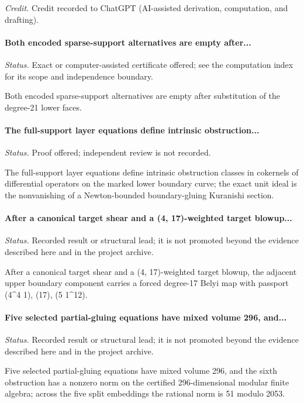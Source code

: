 \emph{Credit.} Credit recorded to ChatGPT (AI-assisted derivation, computation, and drafting).

\label{supp-note-06-019}
\paragraph{Both encoded sparse-support alternatives are empty after...}
\emph{Status.} Exact or computer-assisted certificate offered; see the computation index for its scope and independence boundary.

Both encoded sparse-support alternatives are empty after substitution of the degree-21 lower faces.

\label{supp-note-06-020}
\paragraph{The full-support layer equations define intrinsic obstruction...}
\emph{Status.} Proof offered; independent review is not recorded.

The full-support layer equations define intrinsic obstruction classes in cokernels of differential operators on the marked lower boundary curve; the exact unit ideal is the nonvanishing of a Newton-bounded boundary-gluing Kuranishi section.

\label{supp-note-06-021}
\paragraph{After a canonical target shear and a (4, 17)-weighted target blowup...}
\emph{Status.} Recorded result or structural lead; it is not promoted beyond the evidence described here and in the project archive.

After a canonical target shear and a (4, 17)-weighted target blowup, the adjacent upper boundary component carries a forced degree-17 Belyi map with passport (4\textasciicircum{}4 1), (17), (5 1\textasciicircum{}12).

\label{supp-note-06-022}
\paragraph{Five selected partial-gluing equations have mixed volume 296, and...}
\emph{Status.} Recorded result or structural lead; it is not promoted beyond the evidence described here and in the project archive.

Five selected partial-gluing equations have mixed volume 296, and the sixth obstruction has a nonzero norm on the certified 296-dimensional modular finite algebra; across the five split embeddings the rational norm is 51 modulo 2053.

